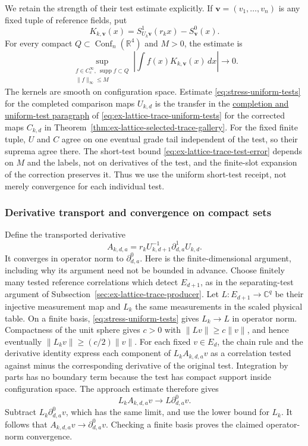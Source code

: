 We retain the strength of their test estimate explicitly. If
$\boldsymbol v=(v_1,\ldots,v_n)$ is any fixed tuple of reference fields,
put
\[
 K_{k,\boldsymbol v}(x)
 =S^1_{U_k\boldsymbol v}(r_kx)-S^0_{\boldsymbol v}(x).
\]
For every compact $Q\subset\operatorname{Conf}_n(\mathbb R^4)$ and
$M>0$, the estimate is
\begin{equation}\label{eq:stress-uniform-tests}
 \sup_{\substack{f\in C_c^\infty,\ \operatorname{supp}f\subset Q\\
                         \|f\|_\infty\le M}}
       \left|\int f(x)K_{k,\boldsymbol v}(x)\,dx\right|
                 \longrightarrow0.
\end{equation}
The kernels are smooth on configuration space. Estimate
\eqref{eq:stress-uniform-tests} for the completed comparison maps $U_{k,d}$
is the transfer in the \hyperref[par:ex-trace-completed-uniform-tests]{completion
and uniform-test paragraph} of
\eqref{eq:ex-lattice-trace-uniform-tests} for the corrected maps $C_{k,d}$
in Theorem~\ref{thm:ex-lattice-selected-trace-gallery}. For the fixed
finite tuple, $U$ and $C$ agree on one eventual grade tail independent of
the test, so their suprema agree there. The short-test bound
\eqref{eq:ex-lattice-trace-test-error} depends on $M$ and the labels, not
on derivatives of the test, and the finite-slot expansion of the
correction preserves it.  Thus we use the uniform short-test receipt, not
merely convergence for each individual test.

\subsubsection{Derivative transport and convergence on compact sets}
Define the transported derivative
\begin{equation}\label{eq:stress-transported-derivative}
 A_{k,d,a}=r_k U_{k,d+1}^{-1}\partial^1_{d,a}U_{k,d}.
\end{equation}
It converges in operator norm to $\partial^0_{d,a}$. Here is the
finite-dimensional argument, including why its argument need not be
bounded in advance. Choose finitely many tested reference correlations
which detect $E_{d+1}$, as in the separating-test argument of
Subsection~\ref{sec:ex-lattice-trace-producer}. Let
$L:E_{d+1}\to\mathbb C^q$ be their injective measurement map and
$L_k$ the same measurements in the scaled physical table. On a finite
basis, \eqref{eq:stress-uniform-tests} gives $L_k\to L$ in operator
norm. Compactness of the unit sphere gives $c>0$ with
$\|Lv\|\ge c\|v\|$, and hence eventually
$\|L_kv\|\ge(c/2)\|v\|$.
For each fixed $v\in E_d$, the chain rule and the derivative identity
express each component of $L_k A_{k,d,a}v$ as a correlation tested
against minus the corresponding derivative of the original test.
Integration by parts has no boundary term because the test has compact
support inside configuration space. The approach estimate therefore gives
\[
 L_k A_{k,d,a}v\longrightarrow L\partial^0_{d,a}v.
\]
Subtract $L_k\partial^0_{d,a}v$, which has the same limit, and use the
lower bound for $L_k$. It follows that
$A_{k,d,a}v\to\partial^0_{d,a}v$. Checking a finite basis proves the
claimed operator-norm convergence.

